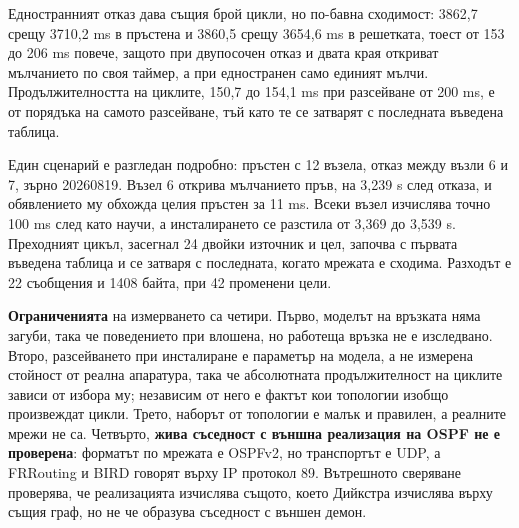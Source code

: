 Едностранният отказ дава същия брой цикли, но по-бавна сходимост: 3862,7 срещу 3710,2 ms в
пръстена и 3860,5 срещу 3654,6 ms в решетката, тоест от 153 до 206 ms повече, защото при
двупосочен отказ и двата края откриват мълчанието по своя таймер, а при едностранен само
единият мълчи. Продължителността на циклите, 150,7 до 154,1 ms при разсейване от 200 ms, е от
порядъка на самото разсейване, тъй като те се затварят с последната въведена таблица.

Един сценарий е разгледан подробно: пръстен с 12 възела, отказ между възли 6 и 7, зърно
20260819. Възел 6 открива мълчанието пръв, на 3,239 s след отказа, и обявлението му обхожда
целия пръстен за 11 ms. Всеки възел изчислява точно 100 ms след като научи, а инсталирането се
разстила от 3,369 до 3,539 s. Преходният цикъл, засегнал 24 двойки източник и цел, започва с
първата въведена таблица и се затваря с последната, когато мрежата е сходима. Разходът е 22
съобщения и 1408 байта, при 42 променени цели.

\textbf{Ограниченията} на измерването са четири. Първо, моделът на връзката няма загуби, така
че поведението при влошена, но работеща връзка не е изследвано. Второ, разсейването при
инсталиране е параметър на модела, а не измерена стойност от реална апаратура, така че
абсолютната продължителност на циклите зависи от избора му; независим от него е фактът кои
топологии изобщо произвеждат цикли. Трето, наборът от топологии е малък и правилен, а реалните
мрежи не са. Четвърто, \textbf{жива съседност с външна реализация на OSPF не е проверена}:
форматът по мрежата е OSPFv2, но транспортът е UDP, а FRRouting и BIRD говорят върху IP
протокол 89. Вътрешното сверяване проверява, че реализацията изчислява същото, което Дийкстра
изчислява върху същия граф, но не че образува съседност с външен демон.
